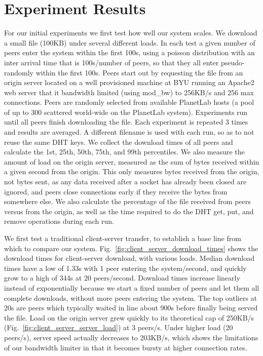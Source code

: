 
\section{Experiment Results}
For our initial experiments we first test how well our system scales. We download a small file (100KB) 
under several different loads. In each test a given number of peers enter the system within 
the first 100s, using a poisson distribution with an inter arrival time that is 100s/number of peers, 
so that they all enter pseudo-randomly within the first 100s. Peers start out by requesting the file from 
an origin server located on a well provisioned machine at BYU running an Apache2 web server that it 
bandwidth limited (using mod\_bw) to 256KB/s and 256 max connections. Peers are randomly selected from available PlanetLab 
hosts (a pool of up to 300 scattered world-wide on the PlanetLab system). Experiments run until 
all peers finish downloading the file. Each experiment is repeated 3 times and results are averaged. 
A different filename is used with each run, so as to not reuse the same DHT keys. We collect the download 
times of all peers and calculate the 1st, 25th, 50th, 75th, and 99th percentiles. We also 
measure the amount of load on the origin server, measured as the sum of bytes received within a given 
second from the origin. This only measures bytes received from the origin, not bytes sent, 
as any data received after a socket has already been closed are ignored, and peers 
close connections early if they receive the bytes from somewhere else. We also calculate the percentage 
of the file received from peers versus from the origin, as well as the time required to do the DHT 
get, put, and remove operations during each run.

We first test a traditional client-server transfer, to establish a base line from which to compare 
our system. Fig.~\ref{fig:client_server_download_times} shows the download times for client-server 
download, with various loads. Median download times have a low of 1.33s with 1 peer entering the system/second, 
and quickly grow to a high of 344s at 20 peers/second. Download times increase linearly instead 
of exponentially because we start a fixed number of peers and let them all complete downloads, without more peers
entering the system. 
The top outliers at 20s are peers which typically waited in line about 900s before finally 
being served the file. Load on the origin server grew quickly to its theoretical cap of 250KB/s (Fig.~\ref{fig:client_server_server_load}) 
at 3 peers/s. Under higher load (20 peers/s), server speed actually decreases to 203KB/s, which 
shows the limitations of our bandwidth limiter in that it becomes bursty at higher connection rates. 

